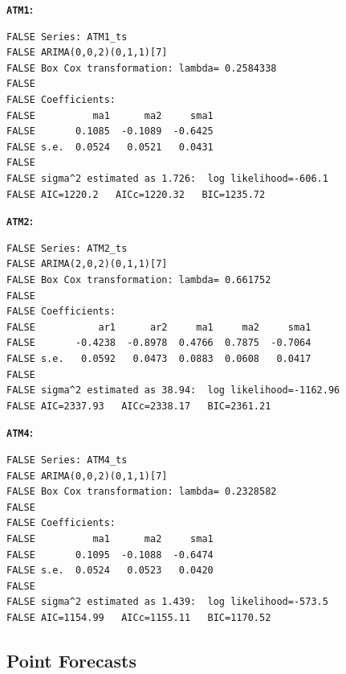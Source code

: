 \documentclass[openany]{book}
\begin{document}
\textbf{\texttt{ATM1}:}

\begin{verbatim}
FALSE Series: ATM1_ts 
FALSE ARIMA(0,0,2)(0,1,1)[7] 
FALSE Box Cox transformation: lambda= 0.2584338 
FALSE 
FALSE Coefficients:
FALSE          ma1      ma2     sma1
FALSE       0.1085  -0.1089  -0.6425
FALSE s.e.  0.0524   0.0521   0.0431
FALSE 
FALSE sigma^2 estimated as 1.726:  log likelihood=-606.1
FALSE AIC=1220.2   AICc=1220.32   BIC=1235.72
\end{verbatim}

\textbf{\texttt{ATM2}:}

\begin{verbatim}
FALSE Series: ATM2_ts 
FALSE ARIMA(2,0,2)(0,1,1)[7] 
FALSE Box Cox transformation: lambda= 0.661752 
FALSE 
FALSE Coefficients:
FALSE           ar1      ar2     ma1     ma2     sma1
FALSE       -0.4238  -0.8978  0.4766  0.7875  -0.7064
FALSE s.e.   0.0592   0.0473  0.0883  0.0608   0.0417
FALSE 
FALSE sigma^2 estimated as 38.94:  log likelihood=-1162.96
FALSE AIC=2337.93   AICc=2338.17   BIC=2361.21
\end{verbatim}

\textbf{\texttt{ATM4}:}

\begin{verbatim}
FALSE Series: ATM4_ts 
FALSE ARIMA(0,0,2)(0,1,1)[7] 
FALSE Box Cox transformation: lambda= 0.2328582 
FALSE 
FALSE Coefficients:
FALSE          ma1      ma2     sma1
FALSE       0.1095  -0.1088  -0.6474
FALSE s.e.  0.0524   0.0523   0.0420
FALSE 
FALSE sigma^2 estimated as 1.439:  log likelihood=-573.5
FALSE AIC=1154.99   AICc=1155.11   BIC=1170.52
\end{verbatim}

\hypertarget{forecast-a}{%
\subsection*{Point Forecasts}\label{forecast-a}}
\end{document}
